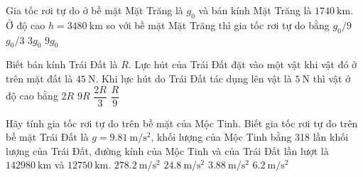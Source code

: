 \begin{ex}
Gia tốc rơi tự do ở bề mặt Mặt Trăng là $g_0$ và bán kính Mặt Trăng là $\SI{1740}{\kilo\meter}$. Ở độ cao $h=\SI{3480}{\kilo\meter}$ so với bề mặt Mặt Trăng thì gia tốc rơi tự do bằng	
	\choice
	{\True $g_0/9$}
	{$g_0/3$}
	{$3g_0$}
	{$9g_0$}
\end{ex}
\begin{ex}
	Biết bán kính Trái Đất là $R$. Lực hút của Trái Đất đặt vào một vật khi vật đó ở trên mặt đất là $\SI{45}{\newton}$. Khi lực hút do Trái Đất tác dụng lên vật là $\SI{5}{\newton}$ thì vật ở độ cao bằng
	\choice
	{\True $2R$}
	{$9R$}
	{$\dfrac{2R}{3}$}
	{$\dfrac{R}{9}$}
\end{ex}
\begin{ex}
	Hãy tính gia tốc rơi tự do trên bề mặt của Mộc Tinh. Biết gia tốc rơi tự do trên bề mặt Trái Đất là $g=\SI{9.81}{\meter/\second^2}$, khối lượng của Mộc Tinh bằng 318 lần khối lượng của Trái Đất, đường kính của Mộc Tinh và của Trái Đất lần lượt là $\SI{142980}{\kilo\meter}$ và $\SI{12750}{\kilo\meter}$.
	\choice
	{$\SI{278.2}{\meter/\second^2}$}
	{\True $\SI{24.8}{\meter/\second^2}$}
	{$\SI{3.88}{\meter/\second^2}$}
	{$\SI{6.2}{\meter/\second^2}$}
\end{ex}
